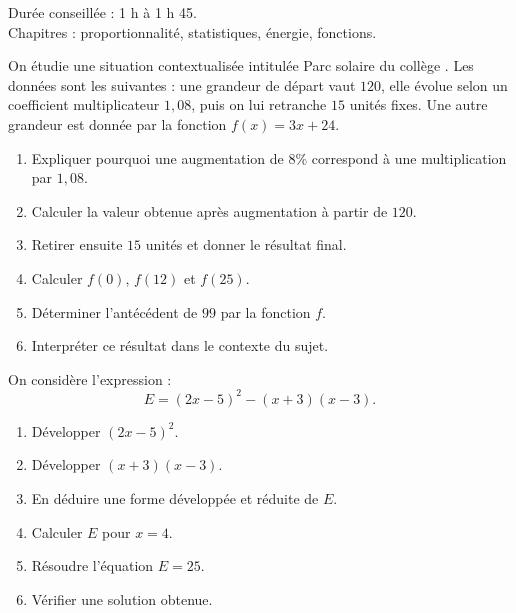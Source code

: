 \documentclass[11pt,a4paper]{article}
\newcounter{exercice}
\begin{document}
\begin{objectif}
Durée conseillée : 1 h à 1 h 45.\\
Chapitres : proportionnalité, statistiques, énergie, fonctions.
\end{objectif}
\begin{exercice}
On étudie une situation contextualisée intitulée \og Parc solaire du collège \fg. Les données sont les suivantes : une grandeur de départ vaut $120$, elle évolue selon un coefficient multiplicateur $1{,}08$, puis on lui retranche $15$ unités fixes. Une autre grandeur est donnée par la fonction $f(x)=3x+24$.
\begin{enumerate}
  \item Expliquer pourquoi une augmentation de $8\%$ correspond à une multiplication par $1{,}08$.
  \item Calculer la valeur obtenue après augmentation à partir de $120$.
  \item Retirer ensuite $15$ unités et donner le résultat final.
  \item Calculer $f(0)$, $f(12)$ et $f(25)$.
  \item Déterminer l'antécédent de $99$ par la fonction $f$.
  \item Interpréter ce résultat dans le contexte du sujet.
\end{enumerate}
\end{exercice}

\begin{exercice}
On considère l'expression :
\[
E=(2x-5)^2-(x+3)(x-3).
\]
\begin{enumerate}
  \item Développer $(2x-5)^2$.
  \item Développer $(x+3)(x-3)$.
  \item En déduire une forme développée et réduite de $E$.
  \item Calculer $E$ pour $x=4$.
  \item Résoudre l'équation $E=25$.
  \item Vérifier une solution obtenue.
\end{enumerate}
\end{exercice}
\end{document}
